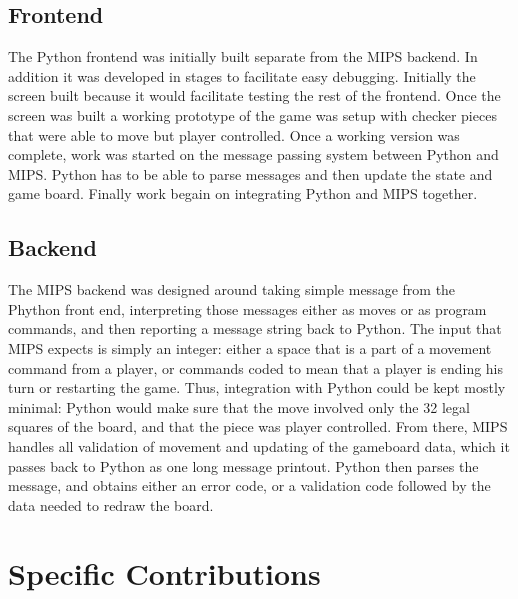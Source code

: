 \documentclass[]{article}
\begin{document}
\subsection*{Frontend}The Python frontend was initially built separate from the MIPS backend. In addition it was developed in stages to facilitate easy debugging. Initially the screen built because it would facilitate testing the rest of the frontend. Once the screen was built a working prototype of the game was setup with checker pieces that were able to move but player controlled. Once a working version was complete, work was started on the message passing system between Python and MIPS. Python has to be able to parse messages and then update the state and game board. Finally work begain on integrating Python and MIPS together.

\subsection*{Backend}The MIPS backend was designed around taking simple message from the Phython front end, interpreting those messages either as moves or as program commands, and then reporting a message string back to Python. The input that MIPS expects is simply an integer: either a space that is a part of a movement command from a player, or commands coded to mean that a player is ending his turn or restarting the game. Thus, integration with Python could be kept mostly minimal: Python would make sure that the move involved only the 32 legal squares of the board, and that the piece was player controlled. From there, MIPS handles all validation of movement and updating of the gameboard data, which it passes back to Python as one long message printout. Python then parses the message, and obtains either an error code, or a validation code followed by the data needed to redraw the board.

\section*{Specific Contributions}
\end{document}

